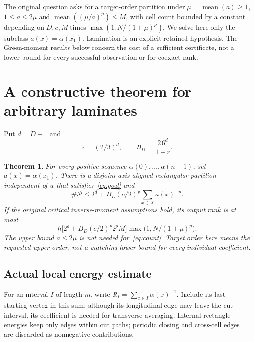 \documentclass[11pt]{article}
\newtheorem{theorem}{Theorem}[section]
\newcommand{\Pcal}{\mathcal P}
\begin{document}
The original question asks for a target-order partition under
$\mu=\operatorname{mean}(a)\ge1$, $1\le a\le2\mu$ and
$\operatorname{mean}((\mu/a)^p)\le M$, with cell count bounded by a constant
depending on $D,c,M$ times $\max(1,N/(1+\mu)^p)$. We solve here only the
subclass $a(x)=\alpha(x_1)$. Lamination is an explicit retained hypothesis.
The Green-moment results below concern the cost of a sufficient certificate,
not a lower bound for every successful observation or for coexact rank.

\section{A constructive theorem for arbitrary laminates}
Put $d=D-1$ and
\[
 r=(2/3)^d,\qquad B_D=\frac{2\,6^d}{1-r}.
\]
\begin{theorem}\label{thm:laminate}
For every positive sequence $\alpha(0),\ldots,\alpha(n-1)$, set
$a(x)=\alpha(x_1)$. There is a disjoint axis-aligned rectangular partition
independent of $u$ that satisfies~\eqref{eq:goal} and
\begin{equation}\label{eq:count}
 \#\Pcal\le2^d+B_D(c/2)^p\sum_{x\in X}a(x)^{-p}.
\end{equation}
If the original critical inverse-moment assumptions hold, its output rank
is at most
\[
 h\bigl[2^d+B_D(c/2)^p2^p M\bigr]
 \max\bigl(1,N/(1+\mu)^p\bigr).
\]
The upper bound $a\le2\mu$ is not needed for~\eqref{eq:count}.
Target order here means the requested upper order, not a matching lower
bound for every individual coefficient.
\end{theorem}

\subsection{Actual local energy estimate}
For an interval $I$ of length $m$, write
$R_I=\sum_{x\in I}\alpha(x)^{-1}$. Include its last starting vertex in
this sum: although its longitudinal edge may leave the cut interval, its
coefficient is needed for transverse averaging. Internal rectangle energies
keep only edges within cut paths; periodic closing and cross-cell edges
are discarded as nonnegative contributions.
\end{document}
